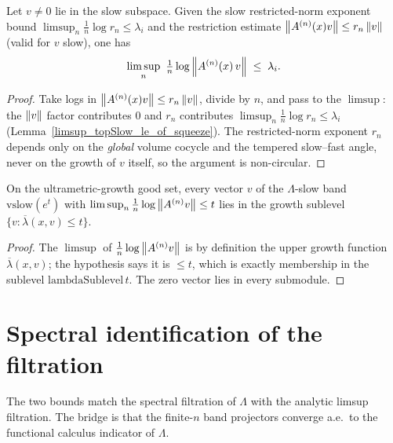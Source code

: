 \begin{theorem}\label{spectral_upper_bound_of_squeeze}
  \leanok
  Let \(v\neq0\) lie in the slow subspace. Given the slow restricted-norm exponent bound
  \(\limsup_n \tfrac1n\log r_n\le \lambda_i\) and the restriction estimate
  \(\left\lVert A^{(n)}(x)v \right\rVert\le r_n\left\lVert v \right\rVert\) (valid for \(v\) slow), one has
  \[
    \limsup_{n}\ \tfrac1n\log\norm{A^{(n)}(x)\,v} \;\le\; \lambda_i.
  \]
\end{theorem}
\begin{proof}\leanok
  Take logs in \(\left\lVert A^{(n)}(x)v \right\rVert\le r_n\left\lVert v \right\rVert\), divide by \(n\), and pass to the \(\limsup\):
  the \(\left\lVert v \right\rVert\) factor contributes \(0\) and \(r_n\) contributes
  \(\limsup_n\tfrac1n\log r_n\le\lambda_i\) (Lemma~\ref{limsup_topSlow_le_of_squeeze}). The
  restricted-norm exponent \(r_n\) depends only on the \emph{global} volume cocycle and the
  tempered slow--fast angle, never on the growth of \(v\) itself, so the argument is
  non-circular.
\end{proof}

\begin{theorem}\label{vslow_subset_lambdaSublevel_of_upper}
  \leanok
  On the ultrametric-growth good set, every vector \(v\) of the \(\Lambda\)-slow band
  \(\mathrm{vslow}(e^t)\) with \(\limsup_n\tfrac1n\log\left\lVert A^{(n)}v \right\rVert\le t\) lies in the growth
  sublevel \(\{v:\overline\lambda(x,v)\le t\}\).
\end{theorem}
\begin{proof}\leanok
  The \(\limsup\) of \(\tfrac1n\log\left\lVert A^{(n)}v \right\rVert\) is by definition the upper growth function
  \(\overline\lambda(x,v)\); the hypothesis says it is \(\le t\), which is exactly membership in
  the sublevel \(\mathrm{lambdaSublevel}\,t\). The zero vector lies in every submodule.
\end{proof}

\section{Spectral identification of the filtration}

The two bounds match the spectral filtration of \(\Lambda\) with the analytic limsup filtration.
The bridge is that the finite-\(n\) band projectors converge a.e.\ to the functional calculus
indicator of \(\Lambda\).

